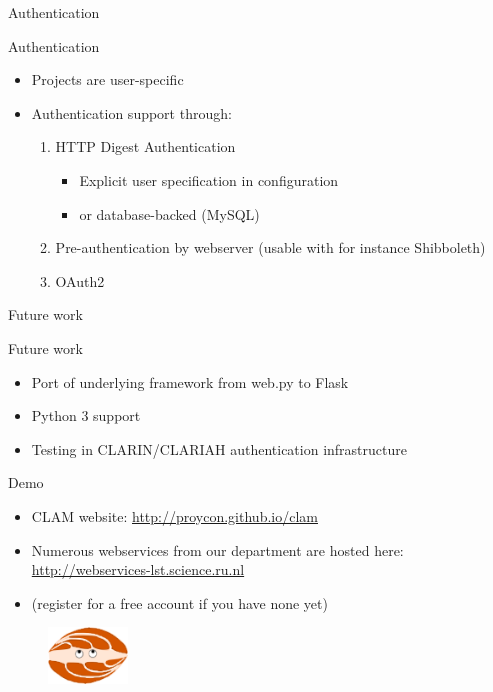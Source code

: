 \documentclass[xcolor=table,10pt,t]{beamer}
\begin{document}
\begin{frame}{Authentication}
  \begin{block}{Authentication}
      \begin{itemize}
        \item Projects are user-specific
        \item Authentication support through:
        \begin{enumerate}
            \item HTTP Digest Authentication
            \begin{itemize}
                \item Explicit user specification in configuration 
                \item or database-backed (MySQL)
            \end{itemize}
            \item Pre-authentication by webserver (usable with for instance Shibboleth)
            \item OAuth2
        \end{enumerate}
       \end{itemize}
  \end{block}
\end{frame}



\begin{frame}{Future work}
  \begin{block}{Future work}
      \begin{itemize}
        \item Port of underlying framework from web.py to Flask
        \item Python 3 support
        \item Testing in CLARIN/CLARIAH authentication infrastructure
      \end{itemize}
  \end{block}
\end{frame}


\begin{frame}{Demo}
  \begin{block}{}
      \begin{itemize}
        \item CLAM website: \url{http://proycon.github.io/clam}
      \end{itemize}

      \begin{itemize}
        \item Numerous webservices from our department are hosted here:
          \url{http://webservices-lst.science.ru.nl}
        \item (register for a free account if you have none yet)
      \end{itemize}
      \medskip
        \begin{figure}
          \includegraphics[height=1.5cm]{clamup.png}
        \end{figure}
  \end{block}
\end{frame}
\end{document}
